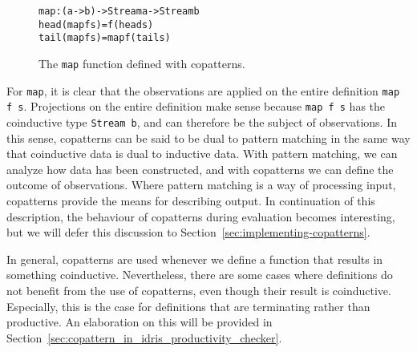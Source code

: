 \begin{figure}
\begin{alltt}
map : (a -> b) -> Stream a -> Stream b
head (map f s) = f (head s)
tail (map f s) = map f (tail s)
\end{alltt}
\caption{The \texttt{map} function defined with copatterns.}
\label{fig:map_copatterns}
\end{figure}

For \texttt{map}, it is clear that the observations are applied on the entire definition \texttt{map f s}. Projections on the entire definition make sense because \texttt{map f s} has the coinductive type \texttt{Stream b}, and can therefore be the subject of observations. In this sense, copatterns can be said to be dual to pattern matching in the same way that coinductive data is dual to inductive data. With pattern matching, we can analyze how data has been constructed, and with copatterns we can define the outcome of observations. Where pattern matching is a way of processing input, copatterns provide the means for describing output. In continuation of this description, the behaviour of copatterns during evaluation becomes interesting, but we will defer this discussion to Section~\ref{sec:implementing-copatterns}.

In general, copatterns are used whenever we define a function that results in something coinductive. Nevertheless, there are some cases where definitions do not benefit from the use of copatterns, even though their result is coinductive. Especially, this is the case for definitions that are terminating rather than productive. An elaboration on this will be provided in Section~\ref{sec:copattern_in_idris_productivity_checker}.





